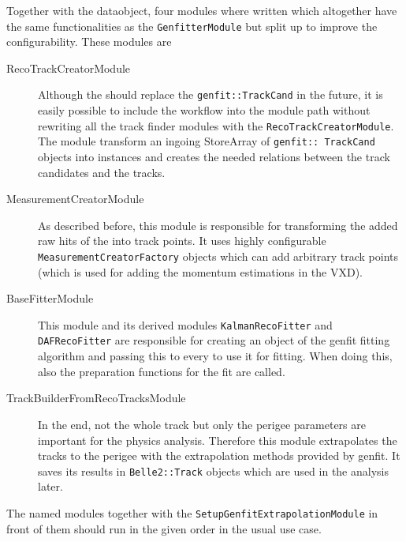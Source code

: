 Together with the \RecoTrack dataobject, four modules where written which altogether have the same functionalities as the \texttt{GenfitterModule} but split up to improve the configurability. These modules are
\begin{description}
 \item[RecoTrackCreatorModule] Although the \RecoTrack should replace the \texttt{genfit::Track\-Cand} in the future, it is easily possible to include the \RecoTrack workflow into the module path without rewriting all the track finder modules with the \texttt{Reco\-Track\-Creator\-Module}. The module transform an ingoing StoreArray of \texttt{genfit::\ Track\-Cand} objects into \RecoTrack instances and creates the needed relations between the track candidates and the tracks.
 \item[MeasurementCreatorModule] As described before, this module is responsible for transforming the added raw hits of the \RecoTrack into track points. It uses highly configurable \texttt{MeasurementCreatorFactory} objects which can add arbitrary track points (which is used for adding the momentum estimations in the VXD).
 \item[BaseFitterModule] This module and its derived modules \texttt{KalmanRecoFitter} and \texttt{DAF\-Reco\-Fitter} are responsible for creating an object of the genfit fitting algorithm and passing this to every \RecoTrack to use it for fitting. When doing this, also the preparation functions for the fit are called.
 \item[TrackBuilderFromRecoTracksModule] In the end, not the whole track but only the perigee parameters are important for the physics analysis. Therefore this module extrapolates the tracks to the perigee with the extrapolation methods provided by genfit. It saves its results in \texttt{Belle2::Track} objects which are used in the analysis later.
\end{description}

The named modules together with the \texttt{SetupGenfitExtrapolationModule} in front of them should run in the given order in the usual use case.



